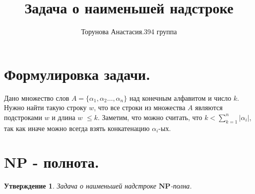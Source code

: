 \documentclass{article}
\title{Задача о наименьшей надстроке}
\author{Торунова Анастасия.394 группа}
\newtheorem*{theorem}{Утверждение}
\begin{document}
\maketitle
\section*{Формулировка задачи.}
Дано множество слов $A=\{\alpha_1, \alpha_2 \ldots ,\alpha_n\}$ над конечным алфавитом и число $k$.
Нужно найти такую строку $w$, что все строки из множества $A$ являются подстроками $w$ и длина $w$ $\leq k$.
Заметим, что можно считать, что $k < \sum_{k=1}^{n} |\alpha_i|$, так как иначе можно всегда взять конкатенацию $\alpha_i$-ых.

\section*{NP - полнота.}
\begin{theorem}
Задача о наименьшей надстроке $\mathbf{NP}$-полна.
\end{theorem}
\end{document}
